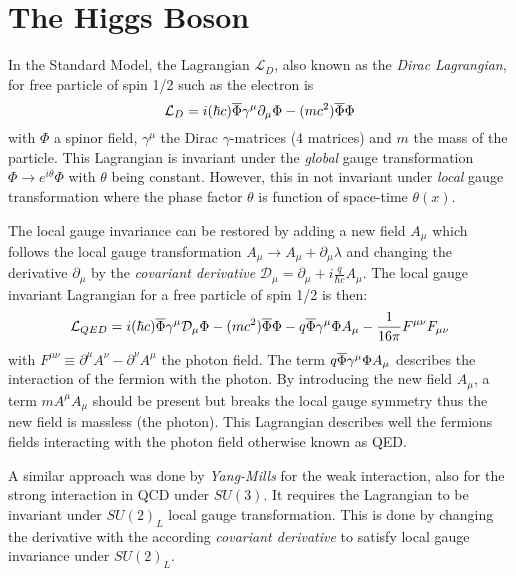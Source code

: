 \section{The Higgs Boson}
\label{sec:HiggsTheo}

In the Standard Model, the Lagrangian $\mathcal{L}_{D}$, also known as the \textit{Dirac Lagrangian}, for free particle of spin 1/2 such as the electron is
\begin{equation}
  \mathcal{L}_{D} = i(\hbar c)\overline{\rm \Phi}\gamma^{\mu}\partial_{\mu}\Phi - (mc^2)\overline{\rm \Phi}\Phi
\end{equation}
with $\Phi$ a spinor field, $\gamma^{\mu}$ the Dirac $\gamma$-matrices (4 matrices) \cite{Peskin:1995ev} and $m$ the mass of the particle. This Lagrangian is invariant under the \textit{global} gauge transformation $\Phi \rightarrow e^{i\theta}\Phi$ with $\theta$ being constant. However, this in not invariant under \textit{local} gauge transformation where the phase factor $\theta$ is function of space-time $\theta(x)$.

The local gauge invariance can be restored by adding a new field $A_{\mu}$ which follows the local gauge transformation $A_{\mu} \rightarrow A_{\mu} + \partial_{\mu}\lambda$ and changing the derivative $\partial_{\mu}$ by the \textit{covariant derivative} $\mathcal{D}_{\mu} = \partial_{\mu} + i\frac{q}{\hbar c}A_{\mu}$. The local gauge invariant Lagrangian for a free particle of spin 1/2 is then:
\begin{equation}
  \mathcal{L}_{QED} = i(\hbar c)\overline{\rm \Phi}\gamma^{\mu}\mathcal{D}_{\mu}\Phi - (mc^2)\overline{\rm \Phi}\Phi - q\overline{\rm \Phi}\gamma^{\mu}\Phi A_{\mu} - \frac{1}{16\pi}F^{\mu\nu}F_{\mu\nu}
\end{equation}
with $F^{\mu\nu} \equiv \partial^{\mu}A^{\nu} - \partial^{\nu}A^{\mu}$ the photon field. The term $q\overline{\rm \Phi}\gamma^{\mu}\Phi A_{\mu}$ describes the interaction of the fermion with the photon. By introducing the new field $A_{\mu}$, a term $mA^{\mu}A_{\mu}$ should be present but breaks the local gauge symmetry thus the new field is massless (the photon). This Lagrangian describes well the fermions fields interacting with the photon field otherwise known as QED.

A similar approach was done by \textit{Yang-Mills} for the weak interaction, also for the strong interaction in QCD under $SU(3)$. It requires the Lagrangian to be invariant under $SU(2)_{L}$ local gauge transformation. This is done by changing the derivative with the according \textit{covariant derivative} to satisfy local gauge invariance under $SU(2)_{L}$.

